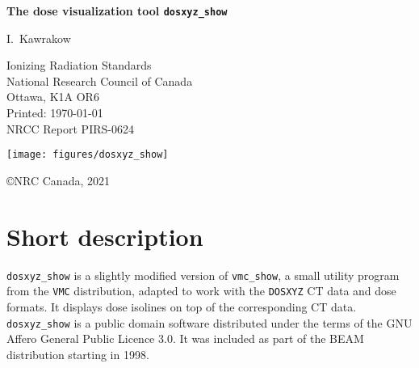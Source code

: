 \documentclass[12pt]{article}
\begin{document}
\pagestyle{empty}

\begin{center}

{\sffamily \bfseries \Huge The dose visualization tool {\tt dosxyz\_show}
\vspace{5mm}\\}
\begin{large}
I.~Kawrakow \\
\end{large}
Ionizing Radiation Standards\\
National Research Council of Canada
\\Ottawa, K1A OR6\\

Printed: \today
\\
\vspace{5mm}
\mbox{}\hfill NRCC Report {\sf PIRS-0624}\\

\vspace{1cm}

\texttt{[image: figures/dosxyz\_show]}


\vfill
\copyright NRC Canada, 2021
\end{center}

\newpage

\pagestyle{fancy}
\setcounter{page}{2}

\section{\sffamily Short description}


{\tt dosxyz\_show} is a slightly modified version of
{\tt vmc\_show}, a small utility program from the
{\tt VMC} distribution,
adapted to work with the {\tt DOSXYZ}
CT data and dose formats. It displays dose
isolines on top of the corresponding CT data.
{\tt dosxyz\_show} is a public domain software distributed under the
terms of the GNU Affero General Public Licence 3.0. It was included as part
of the BEAM distribution starting in 1998.
\end{document}
